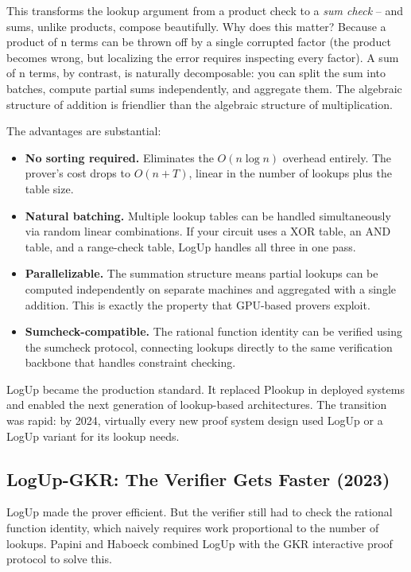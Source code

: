 \documentclass[
  11pt,
  openany]{report}
\providecommand{\tightlist}{%
  \setlength{\itemsep}{0pt}\setlength{\parskip}{0pt}}
\renewcommand{\textbf}[1]{{\bfseries\color{MidnightBold}#1}}
\begin{document}
This transforms the lookup argument from a product check to a \emph{sum check}
-- and sums, unlike products, compose beautifully. Why does this matter? Because
a product of n terms can be thrown off by a single corrupted factor (the product
becomes wrong, but localizing the error requires inspecting every factor). A sum
of n terms, by contrast, is naturally decomposable: you can split the sum into
batches, compute partial sums independently, and aggregate them. The algebraic
structure of addition is friendlier than the algebraic structure of
multiplication.

The advantages are substantial:

\begin{itemize}
\tightlist
\item
  \textbf{No sorting required.} Eliminates the \(O(n \log n)\) overhead
  entirely. The prover's cost drops to \(O(n + T)\), linear in the number of
  lookups plus the table size.
\item
  \textbf{Natural batching.} Multiple lookup tables can be handled
  simultaneously via random linear combinations. If your circuit uses a XOR
  table, an AND table, and a range-check table, LogUp handles all three in one
  pass.
\item
  \textbf{Parallelizable.} The summation structure means partial lookups can be
  computed independently on separate machines and aggregated with a single
  addition. This is exactly the property that GPU-based provers exploit.
\item
  \textbf{Sumcheck-compatible.} The rational function identity can be verified
  using the sumcheck protocol, connecting lookups directly to the same
  verification backbone that handles constraint checking.
\end{itemize}

LogUp became the production standard. It replaced Plookup in deployed systems
and enabled the next generation of lookup-based architectures. The transition
was rapid: by 2024, virtually every new proof system design used LogUp or a
LogUp variant for its lookup needs.

\subsection{LogUp-GKR: The Verifier Gets Faster
(2023)}\label{logup-gkr-the-verifier-gets-faster-2023}

LogUp made the prover efficient. But the verifier still had to check the
rational function identity, which naively requires work proportional to the
number of lookups. Papini and Haboeck combined LogUp with the GKR interactive
proof protocol to solve this.
\end{document}

